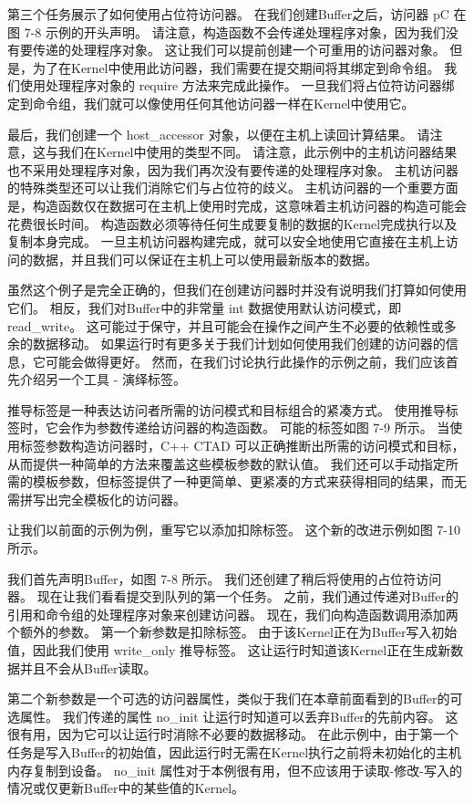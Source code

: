 第三个任务展示了如何使用占位符访问器。 在我们创建Buffer之后，访问器 pC 在图 7-8 示例的开头声明。 
请注意，构造函数不会传递处理程序对象，因为我们没有要传递的处理程序对象。 
这让我们可以提前创建一个可重用的访问器对象。 但是，为了在Kernel中使用此访问器，我们需要在提交期间将其绑定到命令组。 
我们使用处理程序对象的 require 方法来完成此操作。 
一旦我们将占位符访问器绑定到命令组，我们就可以像使用任何其他访问器一样在Kernel中使用它。

最后，我们创建一个 host\_accessor 对象，以便在主机上读回计算结果。 
请注意，这与我们在Kernel中使用的类型不同。 
请注意，此示例中的主机访问器结果也不采用处理程序对象，因为我们再次没有要传递的处理程序对象。 
主机访问器的特殊类型还可以让我们消除它们与占位符的歧义。 
主机访问器的一个重要方面是，构造函数仅在数据可在主机上使用时完成，这意味着主机访问器的构造可能会花费很长时间。 
构造函数必须等待任何生成要复制的数据的Kernel完成执行以及复制本身完成。 
一旦主机访问器构建完成，就可以安全地使用它直接在主机上访问的数据，并且我们可以保证在主机上可以使用最新版本的数据。

虽然这个例子是完全正确的，但我们在创建访问器时并没有说明我们打算如何使用它们。 
相反，我们对Buffer中的非常量 int 数据使用默认访问模式，即 read\_write。 
这可能过于保守，并且可能会在操作之间产生不必要的依赖性或多余的数据移动。 
如果运行时有更多关于我们计划如何使用我们创建的访问器的信息，它可能会做得更好。 
然而，在我们讨论执行此操作的示例之前，我们应该首先介绍另一个工具 - 演绎标签。

推导标签是一种表达访问者所需的访问模式和目标组合的紧凑方式。 
使用推导标签时，它会作为参数传递给访问器的构造函数。 
可能的标签如图 7-9 所示。 当使用标签参数构造访问器时，C++ CTAD 可以正确推断出所需的访问模式和目标，
从而提供一种简单的方法来覆盖这些模板参数的默认值。 
我们还可以手动指定所需的模板参数，但标签提供了一种更简单、更紧凑的方式来获得相同的结果，而无需拼写出完全模板化的访问器。

让我们以前面的示例为例，重写它以添加扣除标签。 这个新的改进示例如图 7-10 所示。

我们首先声明Buffer，如图 7-8 所示。 我们还创建了稍后将使用的占位符访问器。 
现在让我们看看提交到队列的第一个任务。 之前，我们通过传递对Buffer的引用和命令组的处理程序对象来创建访问器。 
现在，我们向构造函数调用添加两个额外的参数。 第一个新参数是扣除标签。 
由于该Kernel正在为Buffer写入初始值，因此我们使用 write\_only 推导标签。 
这让运行时知道该Kernel正在生成新数据并且不会从Buffer读取。

第二个新参数是一个可选的访问器属性，类似于我们在本章前面看到的Buffer的可选属性。 
我们传递的属性 no\_init 让运行时知道可以丢弃Buffer的先前内容。 这很有用，因为它可以让运行时消除不必要的数据移动。 
在此示例中，由于第一个任务是写入Buffer的初始值，因此运行时无需在Kernel执行之前将未初始化的主机内存复制到设备。 
no\_init 属性对于本例很有用，但不应该用于读取-修改-写入的情况或仅更新Buffer中的某些值的Kernel。

